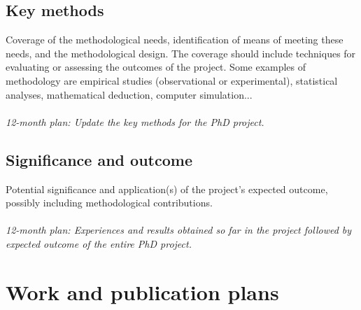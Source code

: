 \subsection{Key methods}
Coverage of the methodological needs, identification of means of meeting these needs, and the methodological design. The coverage should include techniques for evaluating or assessing the outcomes of the project. Some examples of methodology are empirical studies (observational or experimental), statistical analyses, mathematical deduction, computer simulation...
\\
\\
\textit{12-month plan: Update the key methods for the PhD project.}

\subsection{Significance and outcome}
Potential significance and application(s) of the project’s expected outcome, possibly including methodological contributions. 
\\
\\
\textit{12-month plan: Experiences and results obtained so far in the project followed by expected outcome of the entire PhD project.} 

\section{Work and publication plans}\label{sec:plans}
